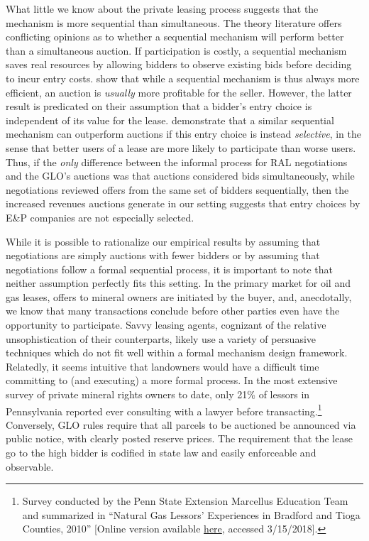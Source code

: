 \documentclass[12pt]{article}
\begin{document}
What little we know about the private leasing process suggests that the mechanism is more sequential than simultaneous. The theory literature offers conflicting opinions as to whether a sequential mechanism will perform better than a simultaneous auction. If participation is costly, a sequential mechanism saves real resources by allowing bidders to observe existing bids before deciding to incur entry costs. \cite{bulow_why_2009} show that while a sequential mechanism is thus always more efficient, an auction is \emph{usually} more profitable for the seller. However, the latter result is predicated on their assumption that a bidder's entry choice is independent of its value for the lease.  \citet{roberts_when_2013} demonstrate that a similar sequential mechanism can outperform auctions if this entry choice is instead \emph{selective}, in the sense that better users of a lease are more likely to participate than worse users. Thus, if the \textit{only} difference between the informal process for RAL negotiations and the GLO's auctions was that auctions considered bids simultaneously, while negotiations reviewed offers from the same set of bidders sequentially, then the increased revenues auctions generate in our setting suggests that entry choices by E\&P companies are not especially selected.

While it is possible to rationalize our empirical results by assuming that negotiations are simply auctions with fewer bidders or by assuming that negotiations follow a formal sequential process, it is important to note that neither assumption perfectly fits this setting. In the primary market for oil and gas leases, offers to mineral owners are initiated by the buyer, and, anecdotally, we know that many transactions conclude before other parties even have the opportunity to participate. Savvy leasing agents, cognizant of the relative unsophistication of their counterparts, likely use a variety of persuasive techniques which do not fit well within a formal mechanism design framework. Relatedly, it seems intuitive that landowners would have a difficult time committing to (and executing) a more formal process. In the most extensive survey of private mineral rights owners to date, only 21\% of lessors in Pennsylvania reported ever consulting with a lawyer before transacting.\footnote{Survey conducted by the Penn State Extension Marcellus Education Team and summarized in ``Natural Gas Lessors' Experiences in Bradford and Tioga Counties, 2010'' [Online version available \hyperlink{https://extension.psu.edu/natural-gas-lessors-experiences-in-bradford-and-tioga-counties-2010-1}{here}, accessed 3/15/2018].} Conversely, GLO rules require that all parcels to be auctioned be announced via public notice, with clearly posted reserve prices. The requirement that the lease go to the high bidder is codified in state law and easily enforceable and observable. 
\end{document}
